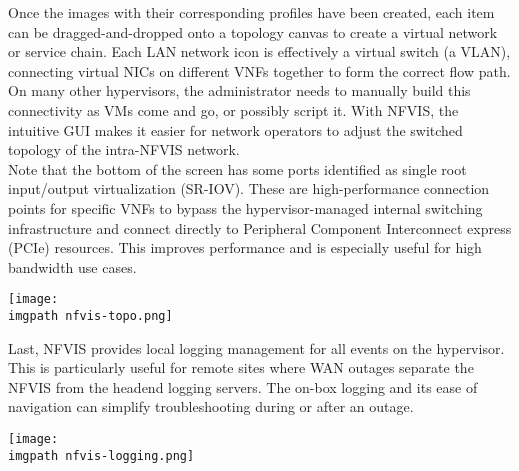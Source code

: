 Once the images with their corresponding profiles have been created, each item
can be dragged-and-dropped onto a topology canvas to create a virtual network
or service chain. Each LAN network icon is effectively a virtual switch (a
VLAN), connecting virtual NICs on different VNFs together to form the correct
flow path. On many other hypervisors, the administrator needs to manually
build this connectivity as VMs come and go, or possibly script it. With NFVIS,
the intuitive GUI makes it easier for network operators to adjust the switched
topology of the intra-NFVIS network.
\\
Note that the bottom of the screen has some ports identified as single root
input/output virtualization (SR-IOV). These are high-performance connection
points for specific VNFs to bypass the hypervisor-managed internal switching
infrastructure and connect directly to Peripheral Component Interconnect
express (PCIe) resources. This improves performance and is especially useful
for high bandwidth use cases.

    \begin{minipage}[t]{\linewidth}
	  \centering
      \texttt{[image: \\imgpath nfvis-topo.png]}
    \end{minipage}

Last, NFVIS provides local logging management for all events on the
hypervisor. This is particularly useful for remote sites where WAN outages
separate the NFVIS from the headend logging servers. The on-box logging and
its ease of navigation can simplify troubleshooting during or after an outage.

    \begin{minipage}[t]{\linewidth}
	  \centering
      \texttt{[image: \\imgpath nfvis-logging.png]}
    \end{minipage}

